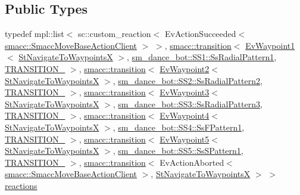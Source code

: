 \subsection*{Public Types}
\begin{DoxyCompactItemize}
\item 
typedef mpl\+::list$<$ sc\+::custom\+\_\+reaction$<$ Ev\+Action\+Succeeded$<$ \hyperlink{classsmacc_1_1SmaccMoveBaseActionClient}{smacc\+::\+Smacc\+Move\+Base\+Action\+Client} $>$ $>$, \hyperlink{classsmacc_1_1transition}{smacc\+::transition}$<$ \hyperlink{structEvWaypoint1}{Ev\+Waypoint1}$<$ \hyperlink{structStNavigateToWaypointsX}{St\+Navigate\+To\+WaypointsX} $>$, \hyperlink{structsm__dance__bot_1_1SS1_1_1SsRadialPattern1}{sm\+\_\+dance\+\_\+bot\+::\+S\+S1\+::\+Ss\+Radial\+Pattern1}, \hyperlink{structStNavigateToWaypointsX_1_1TRANSITION__1}{T\+R\+A\+N\+S\+I\+T\+I\+O\+N\+\_} $>$, \hyperlink{classsmacc_1_1transition}{smacc\+::transition}$<$ \hyperlink{structEvWaypoint2}{Ev\+Waypoint2}$<$ \hyperlink{structStNavigateToWaypointsX}{St\+Navigate\+To\+WaypointsX} $>$, \hyperlink{structsm__dance__bot_1_1SS2_1_1SsRadialPattern2}{sm\+\_\+dance\+\_\+bot\+::\+S\+S2\+::\+Ss\+Radial\+Pattern2}, \hyperlink{structStNavigateToWaypointsX_1_1TRANSITION__2}{T\+R\+A\+N\+S\+I\+T\+I\+O\+N\+\_} $>$, \hyperlink{classsmacc_1_1transition}{smacc\+::transition}$<$ \hyperlink{structEvWaypoint3}{Ev\+Waypoint3}$<$ \hyperlink{structStNavigateToWaypointsX}{St\+Navigate\+To\+WaypointsX} $>$, \hyperlink{structsm__dance__bot_1_1SS3_1_1SsRadialPattern3}{sm\+\_\+dance\+\_\+bot\+::\+S\+S3\+::\+Ss\+Radial\+Pattern3}, \hyperlink{structStNavigateToWaypointsX_1_1TRANSITION__3}{T\+R\+A\+N\+S\+I\+T\+I\+O\+N\+\_} $>$, \hyperlink{classsmacc_1_1transition}{smacc\+::transition}$<$ \hyperlink{structEvWaypoint4}{Ev\+Waypoint4}$<$ \hyperlink{structStNavigateToWaypointsX}{St\+Navigate\+To\+WaypointsX} $>$, \hyperlink{structsm__dance__bot_1_1SS4_1_1SsFPattern1}{sm\+\_\+dance\+\_\+bot\+::\+S\+S4\+::\+Ss\+F\+Pattern1}, \hyperlink{structStNavigateToWaypointsX_1_1TRANSITION__4}{T\+R\+A\+N\+S\+I\+T\+I\+O\+N\+\_} $>$, \hyperlink{classsmacc_1_1transition}{smacc\+::transition}$<$ \hyperlink{structEvWaypoint5}{Ev\+Waypoint5}$<$ \hyperlink{structStNavigateToWaypointsX}{St\+Navigate\+To\+WaypointsX} $>$, \hyperlink{structsm__dance__bot_1_1SS5_1_1SsSPattern1}{sm\+\_\+dance\+\_\+bot\+::\+S\+S5\+::\+Ss\+S\+Pattern1}, \hyperlink{structStNavigateToWaypointsX_1_1TRANSITION__5}{T\+R\+A\+N\+S\+I\+T\+I\+O\+N\+\_} $>$, \hyperlink{classsmacc_1_1transition}{smacc\+::transition}$<$ Ev\+Action\+Aborted$<$ \hyperlink{classsmacc_1_1SmaccMoveBaseActionClient}{smacc\+::\+Smacc\+Move\+Base\+Action\+Client} $>$, \hyperlink{structStNavigateToWaypointsX}{St\+Navigate\+To\+WaypointsX} $>$ $>$ \hyperlink{structStNavigateToWaypointsX_a31eb901ef95dec6c6bd2fffad09858bd}{reactions}
\end{DoxyCompactItemize}
